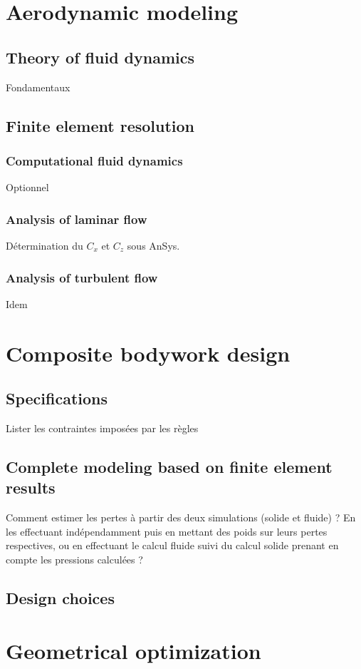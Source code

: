 \documentclass{article}
\begin{document}
\section{Aerodynamic modeling}

\subsection{Theory of fluid dynamics}

Fondamentaux

\subsection{Finite element resolution}

\subsubsection{Computational fluid dynamics}

Optionnel

\subsubsection{Analysis of laminar flow}

Détermination du $C_x$ et $C_z$ sous AnSys.

\subsubsection{Analysis of turbulent flow}

Idem

\section{Composite bodywork design}

\subsection{Specifications}

Lister les contraintes imposées par les règles

\subsection{Complete modeling based on finite element results}

Comment estimer les pertes à partir des deux simulations (solide et fluide) ? En les effectuant indépendamment puis en mettant des poids sur leurs pertes respectives, ou en effectuant le calcul fluide suivi du calcul solide prenant en compte les pressions calculées ? 

\subsection{Design choices}

\section{Geometrical optimization}
\end{document}
